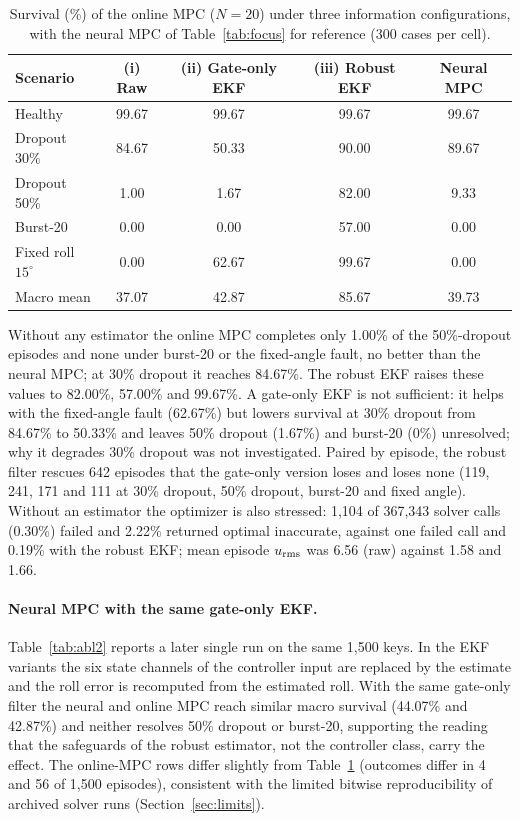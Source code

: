 \documentclass[preprint,12pt,authoryear=false]{elsarticle}
\theoremstyle{remark}\newtheorem{remark}{Remark}
\theoremstyle{plain}\newtheorem{proposition}{Proposition}\newtheorem{lemma}{Lemma}
\theoremstyle{definition}\newtheorem{assumption}{Assumption}
\begin{document}
\begin{table}[t]\centering\small
\caption{Survival (\%) of the online MPC ($N=20$) under three information configurations, with the neural MPC of Table~\ref{tab:focus} for reference (300 cases per cell).}\label{tab:abl}
\begin{tabular}{lcccc}\toprule
Scenario & (i) Raw & (ii) Gate-only EKF & (iii) Robust EKF & Neural MPC\\\midrule
Healthy & 99.67 & 99.67 & 99.67 & 99.67\\
Dropout 30\% & 84.67 & 50.33 & 90.00 & 89.67\\
Dropout 50\% & 1.00 & 1.67 & 82.00 & 9.33\\
Burst-20 & 0.00 & 0.00 & 57.00 & 0.00\\
Fixed roll $15^\circ$ & 0.00 & 62.67 & 99.67 & 0.00\\\midrule
Macro mean & 37.07 & 42.87 & 85.67 & 39.73\\\bottomrule
\end{tabular}
\end{table}

Without any estimator the online MPC completes only 1.00\% of the 50\%-dropout episodes and none under burst-20 or the fixed-angle fault, no better than the neural MPC; at 30\% dropout it reaches 84.67\%. The robust EKF raises these values to 82.00\%, 57.00\% and 99.67\%. A gate-only EKF is not sufficient: it helps with the fixed-angle fault (62.67\%) but lowers survival at 30\% dropout from 84.67\% to 50.33\% and leaves 50\% dropout (1.67\%) and burst-20 (0\%) unresolved; why it degrades 30\% dropout was not investigated. Paired by episode, the robust filter rescues 642 episodes that the gate-only version loses and loses none (119, 241, 171 and 111 at 30\% dropout, 50\% dropout, burst-20 and fixed angle). Without an estimator the optimizer is also stressed: 1{,}104 of 367{,}343 solver calls (0.30\%) failed and 2.22\% returned optimal inaccurate, against one failed call and 0.19\% with the robust EKF; mean episode $u_{\rm rms}$ was 6.56 (raw) against 1.58 and 1.66.

\paragraph{Neural MPC with the same gate-only EKF.} Table~\ref{tab:abl2} reports a later single run on the same 1{,}500 keys. In the EKF variants the six state channels of the controller input are replaced by the estimate and the roll error is recomputed from the estimated roll. With the same gate-only filter the neural and online MPC reach similar macro survival (44.07\% and 42.87\%) and neither resolves 50\% dropout or burst-20, supporting the reading that the safeguards of the robust estimator, not the controller class, carry the effect. The online-MPC rows differ slightly from Table~\ref{tab:abl} (outcomes differ in 4 and 56 of 1{,}500 episodes), consistent with the limited bitwise reproducibility of archived solver runs (Section~\ref{sec:limits}).
\end{document}
